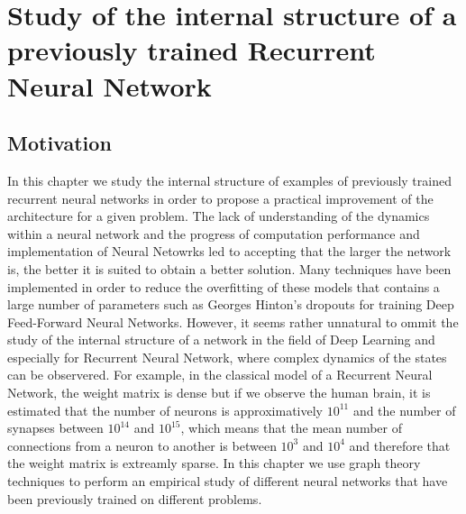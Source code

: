 
\chapter{ Study of the internal structure of a previously trained Recurrent Neural Network} %

\label{Chapter 2} %




\section{Motivation}

In this chapter we study the internal structure of examples of previously trained recurrent neural networks in order to propose a practical improvement of the architecture for a given problem. The lack of understanding of the dynamics within a neural network and the progress of computation performance and implementation of Neural Netowrks led to accepting that the larger the network is, the better it is suited to obtain a better solution. Many techniques have been implemented in order to reduce the overfitting of these models that contains a large number of parameters such as Georges Hinton's dropouts for training Deep Feed-Forward Neural Networks. However, it seems rather unnatural to ommit the study of the internal structure of a network in the field of Deep Learning and especially for Recurrent Neural Network, where complex dynamics of the states can be observered. For example, in the classical model of a Recurrent Neural Network, the weight matrix is dense but if we observe the human brain, it is estimated that the number of neurons is approximatively $10^{11}$ and the number of synapses between $10^{14}$ and $10^{15}$, which means that the mean number of connections from a neuron to another is between $10^3$ and $10^4$ and therefore that the weight matrix is extreamly sparse. In this chapter we use graph theory techniques to perform an empirical study of different neural networks that have been previously trained on different problems. 

